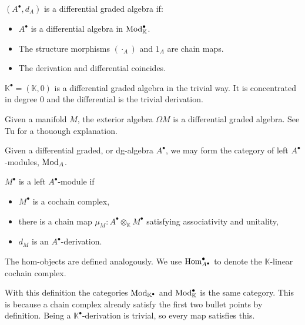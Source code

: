 \documentclass[../thesis.tex]{subfiles}
\begin{document}
            \begin{definition}
                $(A^\bullet,d_A)$ is a differential graded algebra if:
                \begin{itemize}
                    \item $A^\bullet$ is a differential algebra in $\tt{Mod}_\mathbb{K}^\bullet$.
                    \item The structure morphisms $(\cdot_A)$ and $1_A$ are chain maps.
                    \item The derivation and differential coincides.
                \end{itemize}
            \end{definition}

            \begin{example}
                $\mathbb{K}^\bullet = (\mathbb{K},0)$ is a differential graded algebra in the trivial way. It is concentrated in degree $0$ and the differential is the trivial derivation.
            \end{example}
            \begin{example}
                Given a manifold $M$, the exterior algebra $\Omega M$ is a differential graded algebra. See Tu \cite{Tu07} for a thouough explanation.
            \end{example}

            Given a differential graded, or dg-algebra $A^\bullet$, we may form the category of left $A^\bullet$-modules, $\tt{Mod}_A$.
            \begin{definition}
                $M^\bullet$ is a left $A^\bullet$-module if
                \begin{itemize}
                    \item $M^\bullet$ is a cochain complex,
                    \item there is a chain map $\mu_M : A^\bullet\otimes_\mathbb{K} M^\bullet$ satisfying associativity and unitality,
                    \item $d_M$ is an $A^\bullet$-derivation.
                \end{itemize}
            \end{definition}
            The hom-objects are defined analogously. We use $\tt{Hom}_{A^\bullet}^\bullet$ to denote the $\mathbb{K}$-linear cochain complex.

            With this definition the categories $\tt{Mod}_\mathbb{K^\bullet}$ and $\tt{Mod}_\mathbb{K}^\bullet$ is the same category. This is because a chain complex already satisfy the first two bullet points by definition. Being a $\mathbb{K}^\bullet$-derivation is trivial, so every map satisfies this.
\end{document}
